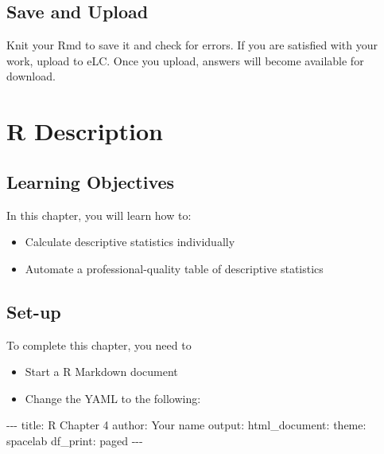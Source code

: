 \documentclass[
]{book}
\makeatletter
\newenvironment{Shaded}{\begin{snugshade}}{\end{snugshade}}
\newcommand{\NormalTok}[1]{#1}
\newcommand{\SpecialCharTok}[1]{\textcolor[rgb]{0,0,0}{#1}}
\newcommand{\StringTok}[1]{\textcolor[rgb]{0.5,0.5,0.5}{#1}}
\providecommand{\tightlist}{%
  \setlength{\itemsep}{0pt}\setlength{\parskip}{0pt}}
\newenvironment{kframe}{%
\medskip{}
\setlength{\fboxsep}{.8em}
 \def\at@end@of@kframe{}%
 \ifinner\ifhmode%
  \def\at@end@of@kframe{\end{minipage}}%
  \begin{minipage}{\columnwidth}%
 \fi\fi%
 \def\FrameCommand##1{\hskip\@totalleftmargin \hskip-\fboxsep
 \colorbox{shadecolor}{##1}\hskip-\fboxsep
     \hskip-\linewidth \hskip-\@totalleftmargin \hskip\columnwidth}%
 \MakeFramed {\advance\hsize-\width
   \@totalleftmargin\z@ \linewidth\hsize
   \@setminipage}}%
 {\par\unskip\endMakeFramed%
 \at@end@of@kframe}
\renewenvironment{Shaded}{\begin{kframe}}{\end{kframe}}
\makeatother
\begin{document}
\hypertarget{save-and-upload}{%
\section{Save and Upload}\label{save-and-upload}}

Knit your Rmd to save it and check for errors. If you are satisfied with your work, upload to eLC. Once you upload, answers will become available for download.

\hypertarget{r-description}{%
\chapter{R Description}\label{r-description}}

\hypertarget{learning-objectives}{%
\section{Learning Objectives}\label{learning-objectives}}

In this chapter, you will learn how to:

\begin{itemize}
\tightlist
\item
  Calculate descriptive statistics individually
\item
  Automate a professional-quality table of descriptive statistics
\end{itemize}

\hypertarget{set-up}{%
\section{Set-up}\label{set-up}}

To complete this chapter, you need to

\begin{itemize}
\tightlist
\item
  Start a R Markdown document
\item
  Change the YAML to the following:
\end{itemize}

\begin{Shaded}
\begin{Highlighting}[]
\SpecialCharTok{{-}{-}{-}}
\NormalTok{title}\SpecialCharTok{:} \StringTok{\textquotesingle{}R Chapter 4\textquotesingle{}}
\NormalTok{author}\SpecialCharTok{:} \StringTok{\textquotesingle{}Your name\textquotesingle{}}
\NormalTok{output}\SpecialCharTok{:} 
\NormalTok{  html\_document}\SpecialCharTok{:}
\NormalTok{    theme}\SpecialCharTok{:}\NormalTok{ spacelab}
\NormalTok{    df\_print}\SpecialCharTok{:}\NormalTok{ paged}
\SpecialCharTok{{-}{-}{-}}
\end{Highlighting}
\end{Shaded}
\end{document}
